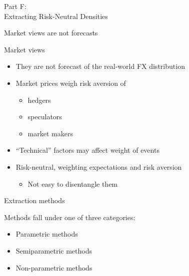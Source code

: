 \begin{frame}{}

\color{blue} \LARGE{Part F:}\\
\LARGE{Extracting Risk-Neutral Densities}

\end{frame}

\begin{frame}{Market views are not forecasts}

Market views

\begin{itemize}
\tightlist
\item
  They are not forecast of the real-world FX distribution
\item
  Market prices weigh risk aversion of

  \begin{itemize}
  \tightlist
  \item
    hedgers
  \item
    speculators
  \item
    market makers
  \end{itemize}
\item
  ``Technical'' factors may affect weight of events
\item
  Risk-neutral, weighting expectations and risk aversion

  \begin{itemize}
  \tightlist
  \item
    Not easy to disentangle them
  \end{itemize}
\end{itemize}

\end{frame}

\begin{frame}{Extraction methods}

Methods fall under one of three categories:

\begin{itemize}
\tightlist
\item
  Parametric methods
\item
  Semiparametric methods
\item
  Non-parametric methods
\end{itemize}

\end{frame}

